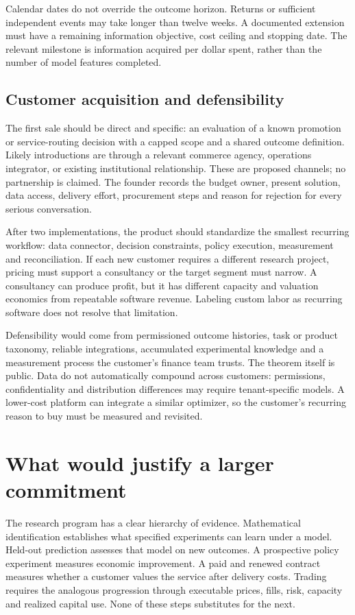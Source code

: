 \documentclass[11pt]{article}
\theoremstyle{remark}\newtheorem{example}{Example}
\begin{document}
Calendar dates do not override the outcome horizon. Returns or sufficient
independent events may take longer than twelve weeks. A documented extension
must have a remaining information objective, cost ceiling and stopping date.
The relevant milestone is information acquired per dollar spent, rather than
the number of model features completed.

\subsection{Customer acquisition and defensibility}
The first sale should be direct and specific: an evaluation of a known
promotion or service-routing decision with a capped scope and a shared outcome
definition. Likely introductions are through a relevant commerce agency,
operations integrator, or existing institutional relationship. These are
proposed channels; no partnership is claimed. The founder records the budget
owner, present solution, data access, delivery effort, procurement steps and
reason for rejection for every serious conversation.

After two implementations, the product should standardize the smallest
recurring workflow: data connector, decision constraints, policy execution,
measurement and reconciliation. If each new customer requires a different
research project, pricing must support a consultancy or the target segment must
narrow. A consultancy can produce profit, but it has different capacity and
valuation economics from repeatable software revenue. Labeling custom labor
as recurring software does not resolve that limitation.

Defensibility would come from permissioned outcome histories, task or product
taxonomy, reliable integrations, accumulated experimental knowledge and a
measurement process the customer's finance team trusts. The theorem itself is
public. Data do not automatically compound across customers: permissions,
confidentiality and distribution differences may require tenant-specific
models. A lower-cost platform can integrate a similar optimizer, so the
customer's recurring reason to buy must be measured and revisited.

\section{What would justify a larger commitment}
The research program has a clear hierarchy of evidence. Mathematical
identification establishes what specified experiments can learn under a model.
Held-out prediction assesses that model on new outcomes. A prospective policy
experiment measures economic improvement. A paid and renewed contract measures
whether a customer values the service after delivery costs. Trading requires
the analogous progression through executable prices, fills, risk, capacity and
realized capital use. None of these steps substitutes for the next.
\end{document}
